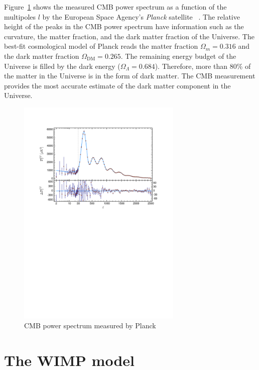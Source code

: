 \documentclass[doublespace,nopageskip]{VTthesis} %
\begin{document}
Figure~\ref{fig:cmb} shows the measured CMB power spectrum as a function of the multipoles $l$ by the European Space Agency's \emph{Planck} satellite  ~\cite{2020A&A...641A...6P}. The relative height of the peaks in the CMB power spectrum have information such as the curvature, the matter fraction, and the dark matter fraction of the Universe. The best-fit cosmological model of Planck reads the matter fraction $\Omega_m = 0.316$ and the dark matter fraction $\Omega_\mathrm{DM} = 0.265$. The remaining energy budget of the Universe is filled by the dark energy ($\Omega_\Lambda = 0.684$). Therefore, more than 80\% of the matter in the Universe is in the form of dark matter. The CMB measurement provides the most accurate estimate of the dark matter component in the Universe.
\begin{figure}[htb]
    \centering
    \includegraphics[width=0.7\textwidth]{Figures/Intro/Planck_CMB.pdf}
    \caption{CMB power spectrum measured by Planck~\cite{2020A&A...641A...6P}}
    \label{fig:cmb}
\end{figure}

\section{The WIMP model}
\end{document}
